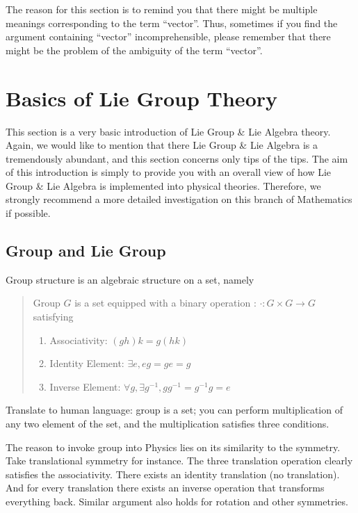 \documentclass[letterpaper,10pt,english]{sphinxmanual}
\begin{document}
The reason for this section is to remind you that there might be multiple meanings corresponding to the term ``vector''. Thus, sometimes if you find the argument containing ``vector'' incomprehensible, please remember that there might be the problem of the ambiguity of the term ``vector''.


\section{Basics of Lie Group Theory}
\label{\detokenize{bg_liegp::doc}}\label{\detokenize{bg_liegp:basics-of-lie-group-theory}}
This section is a very basic introduction of Lie Group \& Lie Algebra theory. Again, we would like to mention that there Lie Group \& Lie Algebra is a tremendously abundant, and this section concerns only tips of the tips. The aim of this introduction is simply to provide you with an overall view of how Lie Group \& Lie Algebra is implemented into physical theories. Therefore, we strongly recommend a more detailed investigation on this branch of Mathematics if possible.


\subsection{Group and Lie Group}
\label{\detokenize{bg_liegp:group-and-lie-group}}
Group structure is an algebraic structure on a set, namely
\begin{quote}

 Group \(G\) is a set equipped with a binary operation : \(\cdot: G\times G\rightarrow G\) satisfying
\begin{enumerate}
\item {} 
Associativity: \((gh)k = g(hk)\)

\item {} 
Identity Element: \(\exists e, eg = ge = g\)

\item {} 
Inverse Element: \(\forall g, \exists g^{-1}, gg^{-1} = g^{-1}g =e\)

\end{enumerate}
\end{quote}

Translate to human language: group is a set; you can perform multiplication of any two element of the set, and the multiplication satisfies three conditions.

The reason to invoke group into Physics lies on its similarity to the symmetry. Take translational symmetry for instance. The three translation operation clearly satisfies the associativity. There exists an identity translation (no translation). And for every translation there exists an inverse operation that transforms everything back. Similar argument also holds for rotation and other symmetries.
\end{document}

